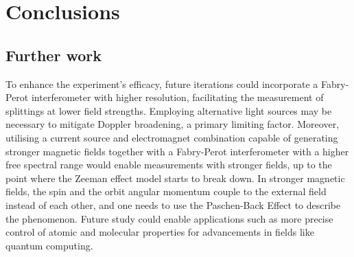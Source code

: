 \documentclass[11pt]{article}
\begin{document}
\section{Conclusions} \label{sec: conclusion}
\subsection{Further work}
To enhance the experiment's efficacy, future iterations could incorporate a Fabry-Perot interferometer with higher resolution, facilitating the measurement of splittings at lower field strengths. Employing alternative light sources may be necessary to mitigate Doppler broadening, a primary limiting factor. Moreover, utilising a current source and electromagnet combination capable of generating stronger magnetic fields together with a Fabry-Perot interferometer with a higher free spectral range would enable measurements with stronger fields, up to the point where the Zeeman effect model starts to break down. In stronger magnetic fields, the spin and the orbit angular momentum couple to the external field instead of each other, and one needs to use the Paschen-Back Effect to describe the phenomenon. Future study could enable applications such as more precise control of atomic and molecular properties for advancements in fields like quantum computing.
\end{document}
